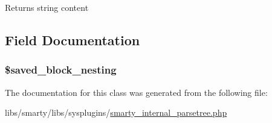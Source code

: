 \begin{DoxyReturn}{Returns}
string content 
\end{DoxyReturn}


\subsection{Field Documentation}
\hypertarget{class__smarty__tag_ab7251b2e342daee7be6f92032fa12424}{}
\subsubsection[{\$saved\+\_\+block\+\_\+nesting}]{\setlength{\rightskip}{0pt plus 5cm}\$saved\+\_\+block\+\_\+nesting}\label{class__smarty__tag_ab7251b2e342daee7be6f92032fa12424}


The documentation for this class was generated from the following file\+:\begin{DoxyCompactItemize}
\item 
libs/smarty/libs/sysplugins/\hyperlink{smarty__internal__parsetree_8php}{smarty\+\_\+internal\+\_\+parsetree.\+php}\end{DoxyCompactItemize}
